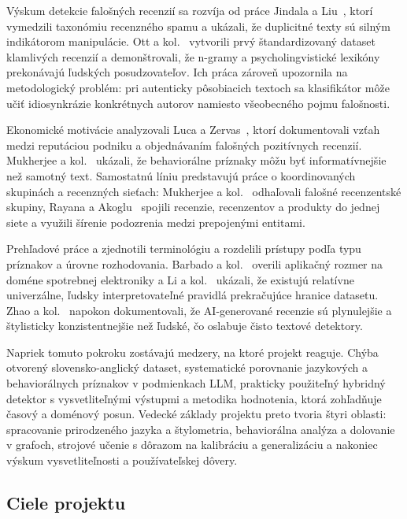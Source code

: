 \documentclass[11pt,a4paper]{article}
\begin{document}
Výskum detekcie falošných recenzií sa rozvíja od práce Jindala a Liu~\cite{jindal2008}, ktorí vymedzili taxonómiu recenzného spamu a ukázali, že duplicitné texty sú silným indikátorom manipulácie. Ott a kol.~\cite{ott2011} vytvorili prvý štandardizovaný dataset klamlivých recenzií a demonštrovali, že n-gramy a psycholingvistické lexikóny prekonávajú ľudských posudzovateľov. Ich práca zároveň upozornila na metodologický problém: pri autenticky pôsobiacich textoch sa klasifikátor môže učiť idiosynkrázie konkrétnych autorov namiesto všeobecného pojmu falošnosti.

Ekonomické motivácie analyzovali Luca a Zervas~\cite{luca2016}, ktorí dokumentovali vzťah medzi reputáciou podniku a objednávaním falošných pozitívnych recenzií. Mukherjee a kol.~\cite{mukherjee2013} ukázali, že behaviorálne príznaky môžu byť informatívnejšie než samotný text. Samostatnú líniu predstavujú práce o koordinovaných skupinách a recenzných sieťach: Mukherjee a kol.~\cite{mukherjee2012} odhaľovali falošné recenzentské skupiny, Rayana a Akoglu~\cite{rayana2015} spojili recenzie, recenzentov a produkty do jednej siete a využili šírenie podozrenia medzi prepojenými entitami.

Prehľadové práce \cite{crawford2015} a \cite{heydari2015} zjednotili terminológiu a rozdelili prístupy podľa typu príznakov a úrovne rozhodovania. Barbado a kol.~\cite{barbado2019} overili aplikačný rozmer na doméne spotrebnej elektroniky a Li a kol.~\cite{li2014} ukázali, že existujú relatívne univerzálne, ľudsky interpretovateľné pravidlá prekračujúce hranice datasetu. Zhao a kol.~\cite{zhao2025} napokon dokumentovali, že AI-generované recenzie sú plynulejšie a štylisticky konzistentnejšie než ľudské, čo oslabuje čisto textové detektory.

Napriek tomuto pokroku zostávajú medzery, na ktoré projekt reaguje. Chýba otvorený slovensko-anglický dataset, systematické porovnanie jazykových a behaviorálnych príznakov v podmienkach LLM, prakticky použiteľný hybridný detektor s vysvetliteľnými výstupmi a metodika hodnotenia, ktorá zohľadňuje časový a doménový posun. Vedecké základy projektu preto tvoria štyri oblasti: spracovanie prirodzeného jazyka a štylometria, behaviorálna analýza a dolovanie v grafoch, strojové učenie s dôrazom na kalibráciu a generalizáciu a nakoniec výskum vysvetliteľnosti a používateľskej dôvery.

\subsection{Ciele projektu}
\end{document}
